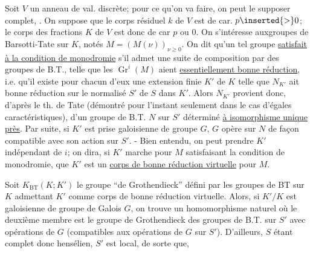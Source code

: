 Soit $V$ un anneau de val. discrète; pour ce qu'on va faire, on peut le supposer complet, . On suppose que le corps résiduel $k$ de $V$ est de car. $p\inserted{>}0$; le corps des fractions $K$ de $V$ est donc de car $p$ ou $0$. On  s'intéresse auxgroupes de Barsotti-Tate sur $K$, notés $M=(M(\nu))_{\nu\geq0}$. On dit qu'un tel groupe \uline{satisfait à la condition de monodromie} s'il admet une suite de composition par des groupes de B.T., telle que les $\operatorname{Gr}^i(M)$ aient \uline{essentiellement bonne réduction}, i.e. qu'il existe pour chacun d'eux une extension finie  $K'$ de $K$ telle que  $N_{K'}$ ait bonne réduction sur le normalisé $S'$ de $S$ dans $K'$. Alors $N_{K'}$ provient  donc, d'après le th. de Tate (démontré pour l'instant seulement dans le cas d'égales caractéristiques), d'un  groupe de B.T. $N$ sur $S'$ déterminé \uline{à isomorphisme unique près}. Par suite, si $K'$ est prise galoisienne de groupe $G$, $G$ opère sur  $N$ de façon compatible avec son action sur $S'$. - Bien entendu, on peut prendre $K'$ indépendant de $i$; on dira, si $K'$ marche pour $M$ satisfaisant la condition de monodromie, que $K'$ est un \uline{corps de bonne réduction virtuelle} pour $M$.

Soit $K_{\mathrm{BT}}(K;K')$ le groupe ``de Grothendieck''  défini par les groupes de BT sur $K$ admettant $K'$ comme corps de bonne réduction virtuelle. Alors, si $K'/K$ est galoisienne de groupe de Galois $G$, on trouve un homomorphisme naturel
où le deuxième membre est le groupe de Grothendieck des groupes de B.T. sur $S'$ avec opérations de $G$ (compatibles aux opérations de $G$ sur $S'$). D'ailleurs, $S$ étant complet donc hensélien, $S'$ est local, de sorte que,

